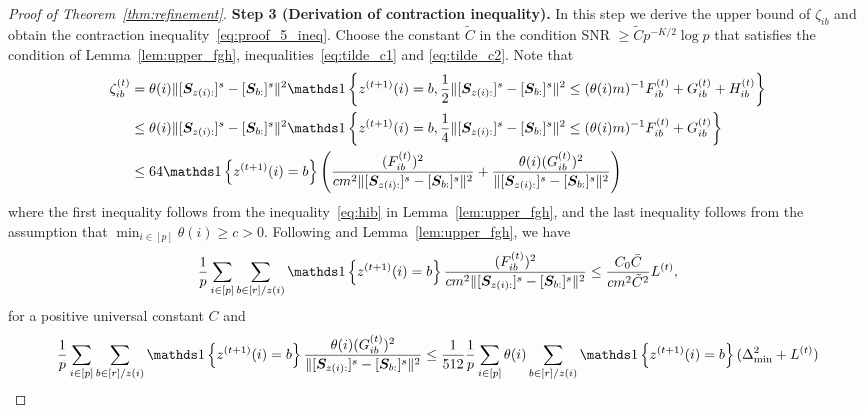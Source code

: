 \documentclass[lettersize,onecolumn,journal]{IEEEtran}
\theoremstyle{definition}
\theoremstyle{definition}
\newcommand{\of}[1]{\left(#1\right)}
\newcommand{\offf}[1]{\left\{#1\right\}}
\begin{document}
\begin{proof}[Proof of Theorem~\ref{thm:refinement}]
    {\bf Step 3 (Derivation of contraction inequality).} In this step we derive the upper bound of $\zeta_{ib}$ and obtain the contraction inequality~\eqref{eq:proof_5_ineq}. Choose the constant $\tilde C$ in the condition SNR $\geq \tilde C p^{-K/2} \log p$ that satisfies the condition of Lemma~\ref{lem:upper_fgh}, inequalities~\eqref{eq:tilde_c1} and \eqref{eq:tilde_c2}. Note that 
    \begin{align}
        \zeta_{ib}^{(t)} &= \theta(i) \onormSize{}{ [ \mS_{ z(i):}  ]^s - [ \mS_{b:}  ]^s  }^2 \ind \offf{z^{(t+1)}(i) = b, \frac{1}{2}\onormSize{}{ [ \mS_{z(i):}  ]^s - [ \mS_{b:}  ]^s  }^2 \leq (\theta(i) m)^{-1} F_{ib}^{(t)} + G_{ib}^{(t)} + H_{ib}^{(t)} }\\
        & \leq \theta(i) \onormSize{}{ [ \mS_{ z(i):}  ]^s - [ \mS_{b:}  ]^s  }^2 \ind \offf{z^{(t+1)}(i) = b, \frac{1}{4}\onormSize{}{ [ \mS_{z(i):}  ]^s - [ \mS_{b:}  ]^s  }^2 \leq (\theta(i) m)^{-1} F_{ib}^{(t)} + G_{ib}^{(t)} } \\
        & \leq 64 \ind \offf{ z^{(t+1)}(i) = b} \of{  \frac{(F_{ib}^{(t)})^2}{ cm^2\onormSize{}{ [ \mS_{z(i):}  ]^s - [ \mS_{b:}  ]^s  }^2} + \frac{\theta(i)(G_{ib}^{(t)})^2}{ \onormSize{}{ [ \mS_{z(i):}  ]^s - [ \mS_{b:}  ]^s  }^2}    }
    \end{align}
    where the first inequality follows from the inequality~\eqref{eq:hib} in Lemma~\ref{lem:upper_fgh}, and the last inequality follows from the assumption that $\min_{i \in [p]} \theta(i) \geq c>0$. Following \citet[Step 4, Proof of Theorem 2]{han2020exact} and Lemma~\ref{lem:upper_fgh}, we have 
    \begin{align}\label{eq:f_sum}
          \frac{1}{p} \sum_{i \in [p]}\sum_{b \in [r]/z(i)} \ind \offf{ z^{(t+1)}(i) = b} \frac{(F_{ib}^{(t)})^2}{ cm^2 \onormSize{}{ [ \mS_{z(i):}  ]^s - [ \mS_{b:}  ]^s  }^2} \leq \frac{C_0 \bar C}{c m^2 \tilde C^2} L^{(t)},
    \end{align}
   for a positive universal constant $C$ and 
    \begin{align}
         \frac{1}{p} \sum_{i \in [p]}\sum_{b \in [r]/z(i)} \ind \offf{ z^{(t+1)}(i) = b} \frac{\theta(i)(G_{ib}^{(t)})^2}{ \onormSize{}{ [ \mS_{z(i):}  ]^s - [ \mS_{b:}  ]^s  }^2}  &\leq \frac{1}{512} \frac{1}{p} \sum_{i \in [p]}\theta(i) \sum_{b \in [r]/z(i)}   \ind \offf{ z^{(t+1)}(i) = b}  (\Delta_{\min}^2 + L^{(t)}) \\

\end{align}
\end{proof}
\end{document}
